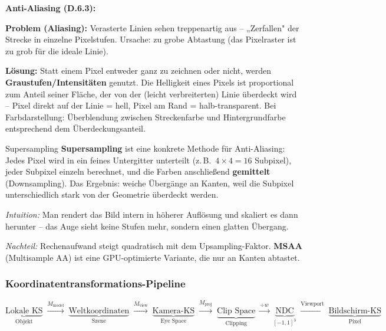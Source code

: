 \documentclass[12pt, a4paper]{article}
\begin{document}
\medskip
\textbf{Anti-Aliasing (D.6.3):}

\textbf{Problem (Aliasing):} Verasterte Linien sehen treppenartig aus -- „Zerfallen" der Strecke in einzelne Pixelstufen. Ursache: zu grobe Abtastung (das Pixelraster ist zu grob für die ideale Linie).

\textbf{Lösung:} Statt einem Pixel entweder ganz zu zeichnen oder nicht, werden \textbf{Graustufen/Intensitäten} genutzt. Die Helligkeit eines Pixels ist proportional zum Anteil seiner Fläche, der von der (leicht verbreiterten) Linie überdeckt wird -- Pixel direkt auf der Linie = hell, Pixel am Rand = halb-transparent. Bei Farbdarstellung: Überblendung zwischen Streckenfarbe und Hintergrundfarbe entsprechend dem Überdeckungsanteil.

\begin{notebox}{Supersampling}
\textbf{Supersampling} ist eine konkrete Methode für Anti-Aliasing: Jedes Pixel wird in ein feines Untergitter unterteilt (z.\,B.\ $4\times4 = 16$ Subpixel), jeder Subpixel einzeln berechnet, und die Farben anschließend \textbf{gemittelt} (Downsampling). Das Ergebnis: weiche Übergänge an Kanten, weil die Subpixel unterschiedlich stark von der Geometrie überdeckt werden.

\textit{Intuition:} Man rendert das Bild intern in höherer Auflösung und skaliert es dann herunter -- das Auge sieht keine Stufen mehr, sondern einen glatten Übergang.

\textit{Nachteil:} Rechenaufwand steigt quadratisch mit dem Upsampling-Faktor. \textbf{MSAA} (Multisample AA) ist eine GPU-optimierte Variante, die nur an Kanten abtastet.
\end{notebox}

\subsubsection*{Koordinatentransformations-Pipeline}

\[
  \underbrace{\text{Lokale KS}}_{\text{Objekt}}
  \;\xrightarrow{M_{\text{model}}}\;
  \underbrace{\text{Weltkoordinaten}}_{\text{Szene}}
  \;\xrightarrow{M_{\text{view}}}\;
  \underbrace{\text{Kamera-KS}}_{\text{Eye Space}}
  \;\xrightarrow{M_{\text{proj}}}\;
  \underbrace{\text{Clip Space}}_{\text{Clipping}}
  \;\xrightarrow{\div w}\;
  \underbrace{\text{NDC}}_{[-1,1]^3}
  \;\xrightarrow{\text{Viewport}}\;
  \underbrace{\text{Bildschirm-KS}}_{\text{Pixel}}
\]
\end{document}
